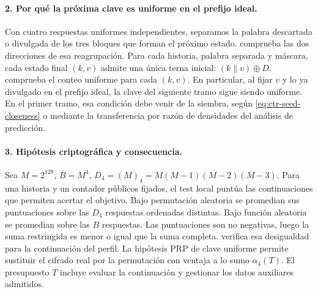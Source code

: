 \paragraph{2. Por qué la próxima clave es uniforme en el prefijo ideal.}
Con cuatro respuestas uniformes independientes, separamos la palabra
descartada o divulgada de los tres bloques que forman el próximo estado.
 comprueba las dos
direcciones de esa reagrupación. Para cada historia, palabra separada y
máscara, cada estado final \((k,v)\) admite una única terna inicial:
\((k\|v)\oplus D\).
 comprueba el conteo uniforme para cada
\((k,v)\). En particular, al fijar \(v\) y lo ya divulgado en el
prefijo ideal, la clave del siguiente tramo sigue siendo uniforme. En el
primer tramo, esa condición debe venir de la siembra, según
\eqref{eq:ctr-seed-closeness} o mediante la transferencia por razón de
densidades del análisis de predicción.

\paragraph{3. Hipótesis criptográfica y consecuencia.}
Sea \(M=2^{128}\), \(B=M^4\), \(D_4=(M)_4=M(M-1)(M-2)(M-3)\).
Para una historia y un contador públicos fijados, el test local puntúa las
continuaciones que permiten acertar el objetivo. Bajo permutación aleatoria
se promedian sus puntuaciones sobre las \(D_4\) respuestas ordenadas
distintas. Bajo función aleatoria se promedian sobre las \(B\) respuestas.
Las puntuaciones son no negativas, luego la suma restringida es menor o
igual que la suma completa. 
verifica esa desigualdad para la continuación del perfil. La hipótesis
PRP de clave uniforme permite sustituir el cifrado real por la permutación
con ventaja a lo sumo \(\alpha_4(T)\). El presupuesto \(T\) incluye
evaluar la continuación y gestionar los datos auxiliares admitidos.


